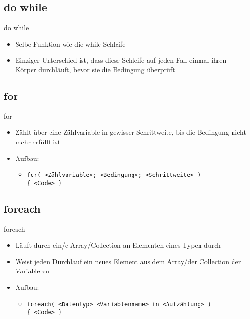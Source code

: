 \subsection{do while}
\begin{frame}{do while}
	\begin{itemize}
		\item Selbe Funktion wie die while-Schleife
		\item Einziger Unterschied ist, dass diese Schleife auf jeden Fall einmal ihren Körper durchläuft, bevor sie die Bedingung überprüft
	\end{itemize}
		
\end{frame}

\subsection{for}
\begin{frame}{for}
	\begin{itemize}
		\item Zählt über eine Zählvariable in gewisser Schrittweite, bis die Bedingung nicht mehr erfüllt ist
		\item Aufbau:
		\begin{itemize}
			\item \alert{\texttt{for( <Zählvariable>; <Bedingung>; <Schrittweite> )\\ \{ <Code> \}}}
		\end{itemize}
	\end{itemize}
		
\end{frame}

\subsection{foreach}
\begin{frame}{foreach}
	\begin{itemize}
		\item Läuft durch ein/e Array/Collection an Elementen eines Typen durch 
		\item Weist jeden Durchlauf ein neues Element aus dem Array/der Collection der Variable zu 
		\item Aufbau:
		\begin{itemize}
			\item \alert{\texttt{foreach( <Datentyp> <Variablenname> in <Aufzählung> )\\ \{ <Code> \}}}
		\end{itemize}
	\end{itemize}
		
\end{frame}

